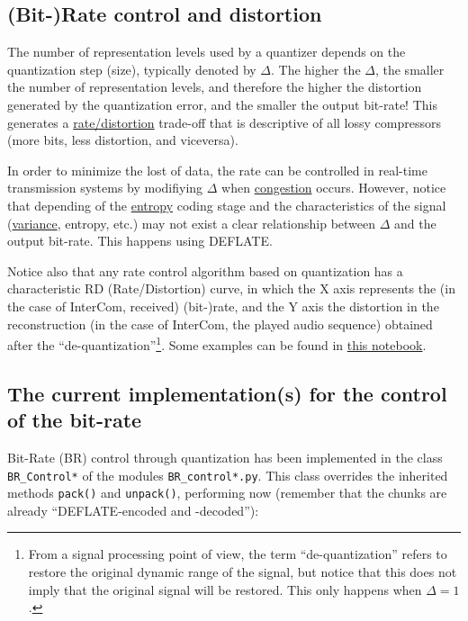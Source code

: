 
\subsection{(Bit-)Rate control and distortion}
The number of representation levels used by a quantizer depends on the
quantization step (size), typically denoted by $\Delta$. The higher
the $\Delta$, the smaller the number of representation levels, and
therefore the higher the distortion generated by the quantization
error, and the smaller the output bit-rate! This generates a
\href{https://en.wikipedia.org/wiki/Rate%E2%80%93distortion_theory}{rate/distortion}
  trade-off that is descriptive of all lossy compressors (more bits,
  less distortion, and viceversa).

  In order to minimize the lost of data, the rate can be controlled in
  real-time transmission systems by modifiying $\Delta$ when
  \href{https://en.wikipedia.org/wiki/Network_congestion}{congestion}
  occurs. However, notice that depending of the
  \href{https://en.wikipedia.org/wiki/Entropy_(information_theory)}{entropy}
  coding stage and the characteristics of the signal
  (\href{https://en.wikipedia.org/wiki/Variance}{variance}, entropy,
  etc.) may not exist a clear relationship between $\Delta$ and the
  output bit-rate. This happens using DEFLATE.

Notice also that any rate control algorithm based on quantization has
a characteristic RD (Rate/Distortion) curve, in which the X axis
represents the (in the case of InterCom, received) (bit-)rate, and the Y
axis the distortion in the reconstruction (in the case of InterCom,
the played audio sequence) obtained after the
``de-quantization''\footnote{From a signal processing point of view,
  the term ``de-quantization'' refers to restore the original dynamic
  range of the signal, but notice that this does not imply that the
  original signal will be restored. This only happens when
  $\Delta=1$.}. Some examples can be found in
\href{https://github.com/Tecnologias-multimedia/Tecnologias-multimedia.github.io/blob/master/contents/BR_control/audio_quantization.ipynb}{this
  notebook}.

\subsection{The current implementation(s) for the control of the bit-rate}
Bit-Rate (BR) control through quantization has been implemented in the
class \verb|BR_Control*| of the modules \texttt{BR\_control*.py}. This
class overrides the inherited methods \verb|pack()| and
\verb|unpack()|, performing now (remember that the chunks are already
``DEFLATE-encoded and -decoded''):

